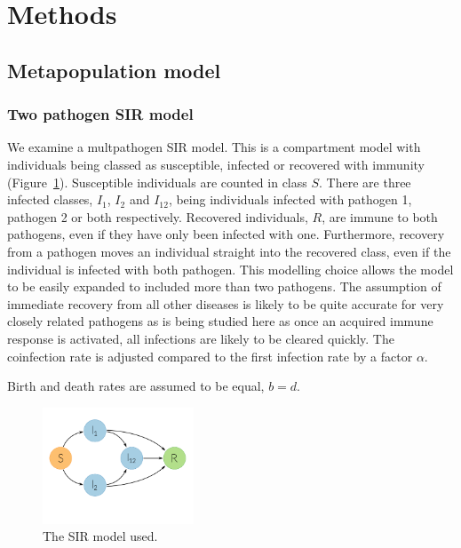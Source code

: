 
\clearpage
\section{Methods}



\subsection{Metapopulation model}





\subsubsection{Two pathogen SIR model}

We examine a multpathogen SIR model. 
This is a compartment model with individuals being classed as susceptible, infected or recovered with immunity (Figure~\ref{f:sir}).
Susceptible individuals are counted in class $S$.
There are three infected classes, $I_1$, $I_2$ and $I_{12}$, being individuals infected with pathogen 1, pathogen 2 or both respectively.
Recovered individuals, $R$, are immune to both pathogens, even if they have only been infected with one.
Furthermore, recovery from a pathogen moves an individual straight into the recovered class, even if the individual is infected with both pathogen.
This modelling choice allows the model to be easily expanded to included more than two pathogens.
The assumption of immediate recovery from all other diseases is likely to be quite accurate for very closely related pathogens as is being studied here as once an acquired immune response is activated, all infections are likely to be cleared quickly.
The coinfection rate is adjusted compared to the first infection rate by a factor $\alpha$.

Birth and death rates are assumed to be equal, $b = d$.


\begin{figure}[b]
\centering

  \includegraphics[width=0.4\textwidth]{imgs/SIRoption1.pdf}
  \caption{The SIR model used.}
  \label{f:sir}
\end{figure}

